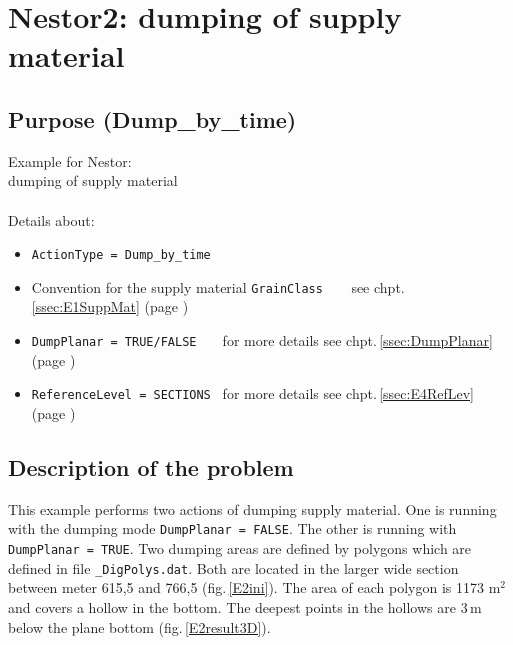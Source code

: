\chapter{Nestor2: dumping of supply material}
%
\section{Purpose (Dump\_by\_time)}
%
Example for Nestor:\\
dumping of supply material\\
\\
Details about:
\begin{itemize}
\item{\texttt{ActionType = Dump\_by\_time}}
\item{Convention for the supply material \texttt{GrainClass~~~}} \,see chpt.\,\ref{ssec:E1SuppMat} (page \pageref{txt:SupplyMaterial})
\item{\texttt{DumpPlanar~=~TRUE/FALSE~~~}} for more details see chpt.\,\ref{ssec:DumpPlanar} (page \pageref{txt:DumpPlanar})
\item{\texttt{ReferenceLevel~=~SECTIONS~}} for more details see chpt.\,\ref{ssec:E4RefLev} (page \pageref{txt:Reflevel})
\end{itemize}



\newpage
\section{Description of the problem}
%
This example performs two actions of dumping supply material.
One is running with the dumping mode \texttt{DumpPlanar~=~FALSE}.
The other is running with \texttt{DumpPlanar~=~TRUE}.
Two dumping areas are defined by polygons which are defined in file \texttt{\_DigPolys.dat}.
Both are located in the larger wide section between meter 615,5 and 766,5 (fig.\,\ref{E2ini}).
The area of each polygon is 1173 m$^2$ and covers a hollow in the bottom.
The deepest points in the hollows are 3\,m below the plane bottom (fig.\,\ref{E2result3D}).\\
\\
